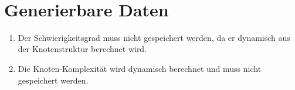 ~\\

\renewcommand{\theenumi}{/GPD\_\arabic{enumi}0/}
\renewcommand{\labelenumi}{\theenumi}

\section{Generierbare Daten}


\begin{enumerate}

\item Der Schwierigkeitsgrad muss nicht gespeichert werden, da er dynamisch aus der Knotenstruktur berechnet wird.
\item Die Knoten-Komplexität wird dynamisch berechnet und muss nicht gespeichert werden.

\end{enumerate}
